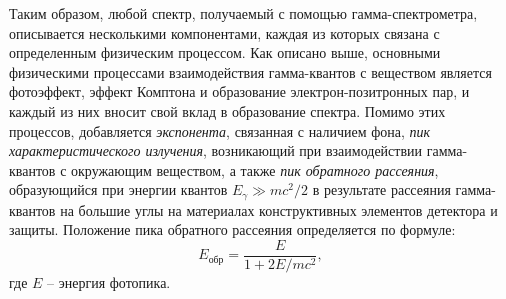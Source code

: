 \documentclass[a4paper, 12pt]{article}
\begin{document}
Таким образом, любой спектр, получаемый с помощью гамма-спектрометра, описывается несколькими компонентами, каждая из которых связана с определенным физическим процессом. Как описано выше, основными физическими процессами взаимодействия гамма-квантов с веществом является фотоэффект, эффект Комптона и образование электрон-позитронных пар, и каждый из них вносит свой вклад в образование спектра. Помимо этих процессов, добавляется \textit{экспонента}, связанная с наличием фона, \textit{пик характеристического излучения}, возникающий при взаимодействии гамма-квантов с окружающим веществом, а также \textit{пик обратного рассеяния}, образующийся при энергии квантов $E_{\gamma}\gg mc^2/2$ в результате рассеяния гамма-квантов на большие углы на материалах  конструктивных элементов детектора и защиты. Положение пика обратного рассеяния определяется по формуле:
\begin{equation}
E_{\text{обр}}=\frac{E}{1+2E/mc^2},
\label{eq:Ereverse}
\end{equation}
где $E$ -- энергия фотопика.\par
\end{document}
